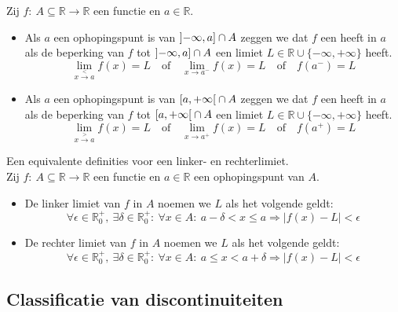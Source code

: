 \documentclass[main.tex]{subfiles}
\begin{document}
\begin{de}
  Zij $f:\ A \subseteq \mathbb{R} \rightarrow \mathbb{R}$ een functie en $a\in \mathbb{R}$.
  \begin{itemize}
  \item Als $a$ een ophopingspunt is van $\interval[open left]{-\infty}{a} \cap A$ zeggen we dat $f$ een  heeft in $a$ als de beperking van $f$ tot $\interval[open left]{-\infty}{a} \cap A$ een limiet $L \in \mathbb{R} \cup \{ -\infty, +\infty \}$ heeft.
    \[ \lim_{x \overset{<}{\rightarrow} a}f(x) = L \quad\text{of}\quad \lim_{x \rightarrow a^{-}}f(x) = L \quad\text{of}\quad f(a^{-}) = L \]
  \item Als $a$ een ophopingspunt is van $\interval[open right]{a}{+\infty} \cap A$ zeggen we dat $f$ een  heeft in $a$ als de beperking van $f$ tot $\interval[open right]{a}{+\infty} \cap A$ een limiet $L \in \mathbb{R} \cup \{ -\infty, +\infty \}$ heeft.
    \[ \lim_{x \overset{>}{\rightarrow} a}f(x) = L \quad\text{of}\quad \lim_{x \rightarrow a^{+}}f(x) = L \quad\text{of}\quad f(a^{+}) = L \]
  \end{itemize}
\end{de}

\begin{st}
  Een equivalente definities voor een linker- en rechterlimiet.\\
  Zij $f:\ A \subseteq \mathbb{R} \rightarrow \mathbb{R}$ een functie en $a\in\mathbb{R}$ een ophopingspunt van $A$.
  \begin{itemize}
  \item De linker limiet van $f$ in $A$ noemen we $L$ als het volgende geldt:
    \[ \forall \epsilon\in\mathbb{R}_{0}^{+},\ \exists \delta \in \mathbb{R}_{0}^{+}:\ \forall x\in A:\ a-\delta<x\le a \Rightarrow |f(x)-L|<\epsilon \]
  \item De rechter limiet van $f$ in $A$ noemen we $L$ als het volgende geldt:
    \[ \forall \epsilon\in\mathbb{R}_{0}^{+},\ \exists \delta \in \mathbb{R}_{0}^{+}:\ \forall x\in A:\ a\le x < a+\delta \Rightarrow |f(x)-L|<\epsilon\]
  \end{itemize}
\end{st}

\subsection{Classificatie van discontinuiteiten}
\end{document}
